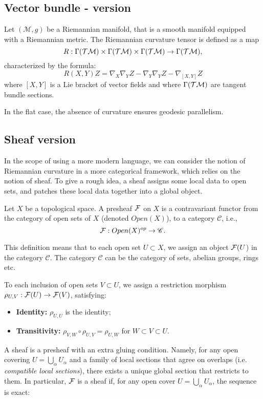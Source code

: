 \subsection{Vector bundle - version}
Let $(\mathcal{M}, g)$ be a Riemannian manifold, that is a smooth manifold equipped with a Riemannian metric.
The Riemannian curvature tensor is defined as a map
\[R:\Gamma(\mathcal{T}\mathcal{M}) \times \Gamma(\mathcal{T}\mathcal{M})  \times \Gamma(\mathcal{T}\mathcal{M}) \to\Gamma(\mathcal{T}\mathcal{M}), \] 
characterized by the formula:
\[R(X,Y)Z=\nabla_X\nabla_YZ-\nabla_Y\nabla_YZ-\nabla_{[X,Y]}Z\]
where $[X,Y]$ is a Lie bracket of vector fields and where $\Gamma(\mathcal{T}\mathcal{M})$ are tangent bundle sections.

\begin{example}
    In the flat case, the absence of curvature ensures geodesic parallelism.
\end{example}
\subsection{Sheaf version}
In the scope of using a more modern language, we can consider the notion of Riemannian curvature in a more categorical framework, which relies on the notion of sheaf. To give a rough idea, a sheaf assigns some local data to open sets, and patches these local data together  into a global object.

\begin{definition}
    Let $X$ be a topological space. A presheaf $\mathcal{F}$ on $X$ is a contravariant functor from the category of open sets of $X$ (denoted $Open(X)$), to a category $\mathscr{C}$, i.e.,
    \[\mathcal{F}:Open(X)^{op}\to \mathscr{C}.\]
\end{definition}

This definition means that to each open set $U\subset X$, we assign an object $\mathcal{F}(U$) in the category $\mathscr{C}$. The category $\mathscr{C}$ can be the category of sets, abelian groups, rings etc.

To each inclusion of open sets $V\subset U$, we assign a restriction morphism $\rho_{U,V}:\mathcal{F}(U)\to \mathcal{F}(V)$, satisfying: 

\begin{itemize}
    \item {\bf Identity:} $\rho_{U,U}$ is the identity;
    \item {\bf Transitivity:}  $\rho_{V,W}\circ\rho_{U,V}=\rho_{U,W}$ for $W\subset V\subset U$.
\end{itemize}

A sheaf is a presheaf with an extra gluing condition. Namely, for any open covering $U=\bigcup\limits_{\alpha} U_\alpha$ and a family of local sections that agree on overlaps (i.e. {\it compatible local sections}), there exists a unique global section that restricts to them.
In particular, $\mathcal{F}$ is a sheaf if, for any open cover $U=\bigcup\limits_{\alpha} U_\alpha$, the sequence is exact: 

